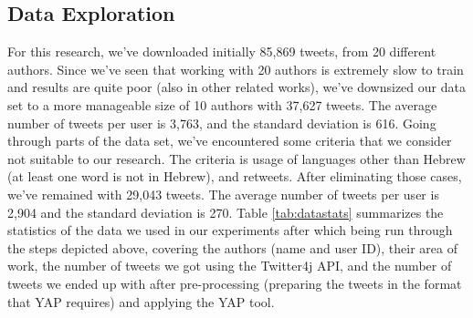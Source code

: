 \documentclass[a4paper]{article}
\begin{document}
\subsection{Data Exploration}

For this research, we've downloaded initially 85,869 tweets, from 20 different authors. Since we've seen that working with 20 authors is extremely slow to train and results are quite poor (also in other related works), we've downsized our data set to a more manageable size of 10 authors with 37,627 tweets.
The average number of tweets per user is 3,763, and the standard deviation is 616.
Going through parts of the data set, we've encountered some criteria that we consider not suitable to our research. The criteria is usage of languages other than Hebrew (at least one word is not in Hebrew), and retweets.
After eliminating those cases, we've remained with 29,043 tweets. The average number of tweets per user is 2,904 and the standard deviation is 270.
Table \ref{tab:datastats} summarizes the statistics of the data we used in our experiments after which being run through the steps depicted above, covering the authors (name and user ID), their area of work, the number of tweets we got using the Twitter4j API, and the number of tweets we ended up with after pre-processing (preparing the tweets in the format that YAP requires) and applying the YAP tool.\\
\end{document}
